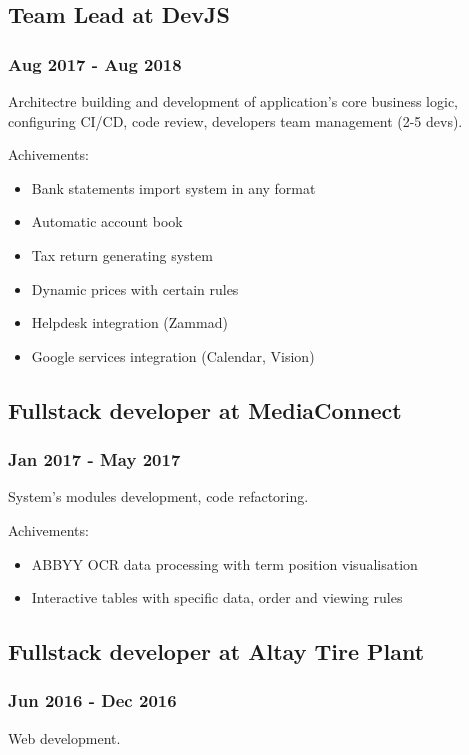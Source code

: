 \documentclass[letterpaper]{article}
\begin{document}
\subsection{Team Lead at DevJS}
\label{sec:orgd8e6582}
\subsubsection{Aug 2017 - Aug 2018}
\label{sec:orgf85e04a}
Architectre building and development of application's core business logic, configuring CI/CD, code review, developers team management (2-5 devs).

Achivements:
\begin{itemize}
\item Bank statements import system in any format
\item Automatic account book
\item Tax return generating system
\item Dynamic prices with certain rules
\item Helpdesk integration (Zammad)
\item Google services integration (Calendar, Vision)
\end{itemize}

\subsection{Fullstack developer at MediaConnect}
\label{sec:org1237c5c}
\subsubsection{Jan 2017 - May 2017}
\label{sec:orgd67c87a}
System's modules development, code refactoring.

Achivements:
\begin{itemize}
\item ABBYY OCR data processing with term position visualisation
\item Interactive tables with specific data, order and viewing rules
\end{itemize}

\subsection{Fullstack developer at Altay Tire Plant}
\label{sec:org10010f0}
\subsubsection{Jun 2016 - Dec 2016}
\label{sec:org636ac1a}
Web development.
\end{document}
